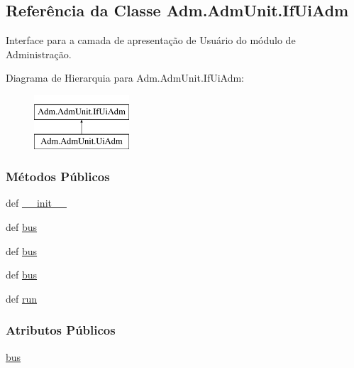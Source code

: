 \hypertarget{classAdm_1_1AdmUnit_1_1IfUiAdm}{\subsection{Referência da Classe Adm.\-Adm\-Unit.\-If\-Ui\-Adm}
\label{classAdm_1_1AdmUnit_1_1IfUiAdm}
}


Interface para a camada de apresentação de Usuário do módulo de Administração.  


Diagrama de Hierarquia para Adm.\-Adm\-Unit.\-If\-Ui\-Adm\-:\begin{figure}[H]
\begin{center}
\leavevmode
\includegraphics[height=2.000000cm]{d7/d07/classAdm_1_1AdmUnit_1_1IfUiAdm}
\end{center}
\end{figure}
\subsubsection*{Métodos Públicos}
\begin{DoxyCompactItemize}
\item 
def \hyperlink{classAdm_1_1AdmUnit_1_1IfUiAdm_ab37924016cd115531c85439dc82f5ea3}{\-\_\-\-\_\-init\-\_\-\-\_\-}
\item 
def \hyperlink{classAdm_1_1AdmUnit_1_1IfUiAdm_a4863c3ebab6e5fac647ab32415153470}{bus}
\item 
def \hyperlink{classAdm_1_1AdmUnit_1_1IfUiAdm_a4863c3ebab6e5fac647ab32415153470}{bus}
\item 
def \hyperlink{classAdm_1_1AdmUnit_1_1IfUiAdm_a4863c3ebab6e5fac647ab32415153470}{bus}
\item 
def \hyperlink{classAdm_1_1AdmUnit_1_1IfUiAdm_ad2879ed80544aa2a153c7eeed3a09a52}{run}
\end{DoxyCompactItemize}
\subsubsection*{Atributos Públicos}
\begin{DoxyCompactItemize}
\item 
\hyperlink{classAdm_1_1AdmUnit_1_1IfUiAdm_a604bb1c41014e85eee44db64a79a7fcc}{bus}
\end{DoxyCompactItemize}


